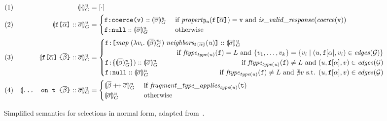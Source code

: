 \begin{figure*}[t]
    \centering
    \begin{align*}
    & (1) & \seval{\cdot}{u} &= [\cdot] \\
    & (2) & \sevalu{\fld :: \sset} &= 
    \begin{cases}
      \resp{\texttt{coerce(\val)}} :: \sevalu{\sset}  
        & \text{ if } \mathit{property_{u}(\fld)} = \val \text{ and } \mathit{is\_valid\_response (coerce (\val))} \\
      \resp{\nval} :: \sevalu{\sset} 
      & \text{ otherwise}
    \end{cases}\\
    & (3) & %
    \sevalu{\nfld{\overline{\beta}} :: \sset} &=
    \begin{cases}
      \resp{\texttt{[} \mathit{map}\; (\lambda v_{i}.\; \seval{\overline{\beta}}{v_{i}})\; 
      \mathit{neighbors_{\fld}(u)} \texttt{]}} :: \sevalu{\sset}  \\
     \hfill \text{ if } 
            \mathit{ftype_{type(u)}(\fkey)} = L \text{ and } \{v_{1}, \ldots, v_{k}\} = 
        \{v_{i} \mid (u, \fkey[\alpha], v_{i}) \in \mathit{edges}(\graph)\} \\
      \resp{\{\seval{\subqueries{\beta}}{v}\})} :: \sevalu{\sset}  
      \hfill \text{ if } 
        \mathit{ftype_{type(u)}(\fkey)}  \neq L \text{ and } (u, \fkey[\alpha], v) \in \mathit{edges}(\graph) \\
      \resp{\nval} :: \sevalu{\sset} 
     \qquad \qquad \qquad \qquad \qquad
    \text{ if } \mathit{ftype_{type(u)}(\fkey)}  \neq L  \text{ and } \nexists v \text{ s.t. }  (u, \fkey[\alpha], v) \in \mathit{edges}(\graph) \\
    \end{cases}\\
    & (4) & \sevalu{\ifrag{t}{\overline{\beta}}:: \sset} &= \begin{cases}
    \sevalu{\overline{\beta} \mdoubleplus \sset} & 
  	\text{ if }\mathit{fragment\_type\_applies_{type(u)}(\texttt{t})}\\
    \sevalu{\sset} & \text{ otherwise}
    \end{cases}
    \end{align*}
    \caption{Simplified semantics for selections in normal form, adapted from~\cite{gqlph}.} 
    \label{fig:simpl_semantics}
\end{figure*}

